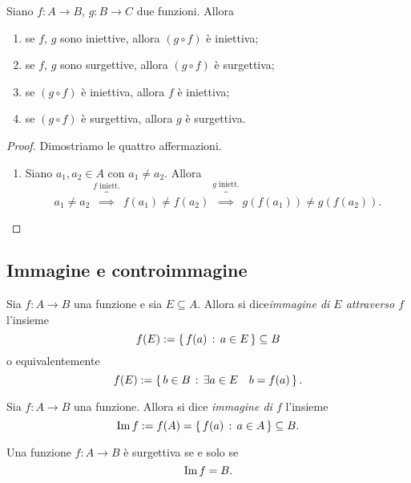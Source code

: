 \begin{proposition}
    Siano $f : A \to B$, $g : B \to C$ due funzioni.
    Allora \begin{enumerate}[label={(\roman*)}]
        \item se $f$, $g$ sono iniettive, allora $(g \circ f)$ è iniettiva;
        \item se $f$, $g$ sono surgettive, allora $(g \circ f)$ è surgettiva;
        \item se $(g \circ f)$ è iniettiva, allora $f$ è iniettiva;
        \item se $(g \circ f)$ è surgettiva, allora $g$ è surgettiva.
    \end{enumerate}
\end{proposition}
\begin{proof}
    Dimostriamo le quattro affermazioni. \begin{enumerate}
        \item Siano $a_1, a_2 \in A$ con $a_1 \neq a_2$. Allora \[
            a_1 \neq a_2 \overbrace{\implies}^{f \text{ iniett.}} f(a_1) \neq f(a_2) \overbrace{\implies}^{g \text{ iniett.}}  g(f(a_1)) \neq g(f(a_2)).
        \]
    \end{enumerate}
\end{proof}

\subsection{Immagine e controimmagine}

\begin{definition}
    Sia $f : A \to B$ una funzione e sia $E \subseteq A$. Allora si dice\emph {immagine di $E$ attraverso $f$} l'insieme\[
        f(E) := \left\{\,f(a) \,:\, a \in E\,\right\} \subseteq B    
    \]
    o equivalentemente \[
        f(E) := \left\{\,b \in B \,:\, \exists a \in E \quad b = f(a)\,\right\}.    
    \]
\end{definition}


\begin{definition}
    Sia $f : A \to B$ una funzione. Allora si dice \emph{immagine di $f$} l'insieme \[
        \operatorname{Im} f := f(A) = \left\{\,f(a) \,:\, a \in A\,\right\} \subseteq B.
    \]
\end{definition}

\begin{remark}
    Una funzione $f : A \to B$ è surgettiva se e solo se \[
        \operatorname{Im} f = B.    
    \]
\end{remark}

